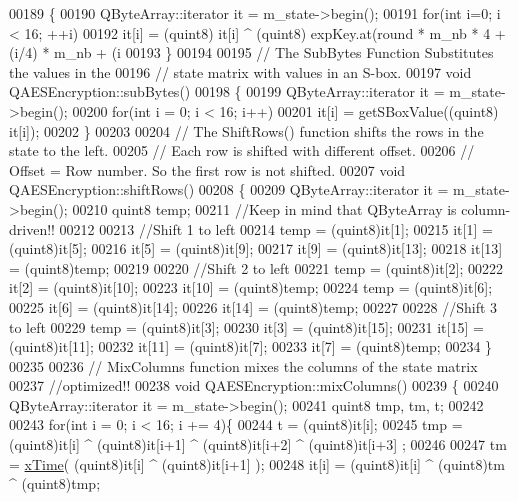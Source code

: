 \begin{DoxyCode}
00189 \{
00190   QByteArray::iterator it = m\_state->begin();
00191   \textcolor{keywordflow}{for}(\textcolor{keywordtype}{int} i=0; i < 16; ++i)
00192       it[i] = (quint8) it[i] ^ (quint8) expKey.at(round * m\_nb * 4 + (i/4) * m\_nb + (i%
00193 \}
00194 
00195 \textcolor{comment}{// The SubBytes Function Substitutes the values in the}
00196 \textcolor{comment}{// state matrix with values in an S-box.}
00197 \textcolor{keywordtype}{void} QAESEncryption::subBytes()
00198 \{
00199   QByteArray::iterator it = m\_state->begin();
00200   \textcolor{keywordflow}{for}(\textcolor{keywordtype}{int} i = 0; i < 16; i++)
00201     it[i] = getSBoxValue((quint8) it[i]);
00202 \}
00203 
00204 \textcolor{comment}{// The ShiftRows() function shifts the rows in the state to the left.}
00205 \textcolor{comment}{// Each row is shifted with different offset.}
00206 \textcolor{comment}{// Offset = Row number. So the first row is not shifted.}
00207 \textcolor{keywordtype}{void} QAESEncryption::shiftRows()
00208 \{
00209     QByteArray::iterator it = m\_state->begin();
00210     quint8 temp;
00211     \textcolor{comment}{//Keep in mind that QByteArray is column-driven!!}
00212 
00213      \textcolor{comment}{//Shift 1 to left}
00214     temp   = (quint8)it[1];
00215     it[1]  = (quint8)it[5];
00216     it[5]  = (quint8)it[9];
00217     it[9]  = (quint8)it[13];
00218     it[13] = (quint8)temp;
00219 
00220     \textcolor{comment}{//Shift 2 to left}
00221     temp   = (quint8)it[2];
00222     it[2]  = (quint8)it[10];
00223     it[10] = (quint8)temp;
00224     temp   = (quint8)it[6];
00225     it[6]  = (quint8)it[14];
00226     it[14] = (quint8)temp;
00227 
00228     \textcolor{comment}{//Shift 3 to left}
00229     temp   = (quint8)it[3];
00230     it[3]  = (quint8)it[15];
00231     it[15] = (quint8)it[11];
00232     it[11] = (quint8)it[7];
00233     it[7]  = (quint8)temp;
00234 \}
00235 
00236 \textcolor{comment}{// MixColumns function mixes the columns of the state matrix}
00237 \textcolor{comment}{//optimized!!}
00238 \textcolor{keywordtype}{void} QAESEncryption::mixColumns()
00239 \{
00240   QByteArray::iterator it = m\_state->begin();
00241   quint8 tmp, tm, t;
00242 
00243   \textcolor{keywordflow}{for}(\textcolor{keywordtype}{int} i = 0; i < 16; i += 4)\{
00244     t       = (quint8)it[i];
00245     tmp     =  (quint8)it[i] ^ (quint8)it[i+1] ^ (quint8)it[i+2] ^ (quint8)it[i+3] ;
00246 
00247     tm      = \hyperlink{qaesencryption_8cpp_a94a5c6f286db021d028ddc6f91a65f72}{xTime}( (quint8)it[i] ^ (quint8)it[i+1] );
00248     it[i]   = (quint8)it[i] ^ (quint8)tm ^ (quint8)tmp;

\end{DoxyCode}
